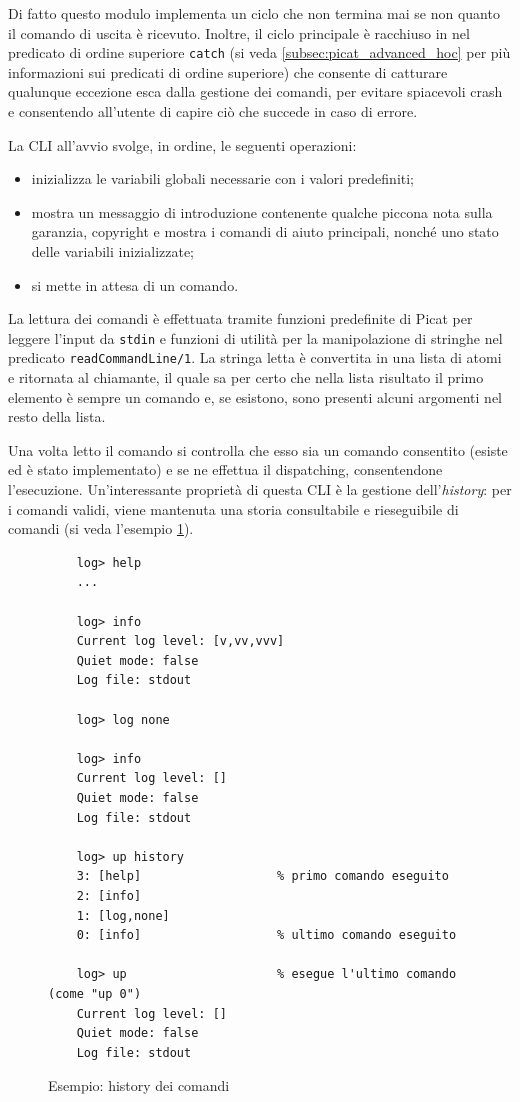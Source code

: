 \documentclass[12pt,a4paper,openright]{book} %
\begin{document}
Di fatto questo modulo implementa un ciclo che non termina mai se non
quanto il comando di uscita è ricevuto. Inoltre, il ciclo principale è
racchiuso in nel predicato di ordine superiore \texttt{catch} (si veda
\ref{subsec:picat_advanced_hoc} per più informazioni sui predicati di
ordine superiore) che consente di catturare qualunque eccezione esca
dalla gestione dei comandi, per evitare spiacevoli crash e consentendo
all'utente di capire ciò che succede in caso di errore.

La CLI all'avvio svolge, in ordine, le seguenti operazioni:
\begin{itemize}
	\item inizializza le variabili globali necessarie con i valori
          predefiniti;
	\item mostra un messaggio di introduzione contenente qualche
          piccona nota sulla garanzia, copyright e mostra i comandi di
          aiuto principali, nonché uno stato delle variabili
          inizializzate;
	\item si mette in attesa di un comando.
\end{itemize}

La lettura dei comandi è effettuata tramite funzioni predefinite di
Picat per leggere l'input da \texttt{stdin} e funzioni di utilità per
la manipolazione di stringhe nel predicato
\texttt{readCommandLine/1}. La stringa letta è convertita in una lista
di atomi e ritornata al chiamante, il quale sa per certo che nella
lista risultato il primo elemento è sempre un comando e, se esistono,
sono presenti alcuni argomenti nel resto della lista.

Una volta letto il comando si controlla che esso sia un comando
consentito (esiste ed è stato implementato) e se ne effettua il
dispatching, consentendone l'esecuzione. Un'interessante proprietà di
questa CLI è la gestione dell'\textit{history}: per i comandi validi,
viene mantenuta una storia consultabile e rieseguibile di comandi (si
veda l'esempio \ref{fig:example_commandshistory}).

\begin{figure}
	\begin{verbatim}
	log> help
	...

	log> info
	Current log level: [v,vv,vvv]
	Quiet mode: false
	Log file: stdout

	log> log none

	log> info
	Current log level: []
	Quiet mode: false
	Log file: stdout

	log> up history
	3: [help]                   % primo comando eseguito
	2: [info]
	1: [log,none]
	0: [info]                   % ultimo comando eseguito

	log> up                     % esegue l'ultimo comando (come "up 0")
	Current log level: []
	Quiet mode: false
	Log file: stdout
	\end{verbatim}
	\caption{Esempio: history dei comandi}
	\label{fig:example_commandshistory}
\end{figure}
\end{document}
